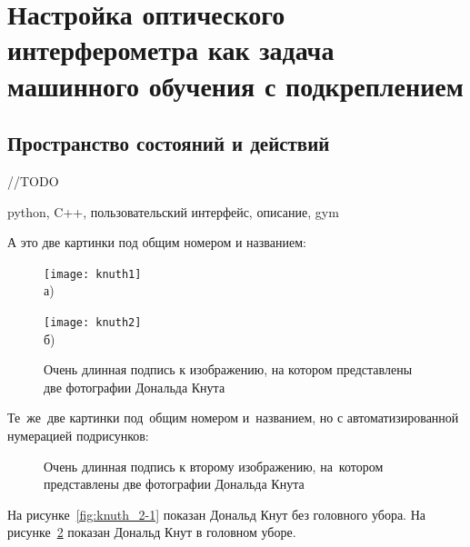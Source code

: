 \section{Настройка оптического интерферометра как задача машинного обучения с подкреплением}\label{sec:ch2/sect2}

\subsection{Пространство состояний и действий}

//TODO

python, C++, пользовательский интерфейс, описание, gym

А это две картинки под общим номером и названием:
\begin{figure}[ht]
    \begin{minipage}[b][][b]{0.49\linewidth}\centering
        \texttt{[image: knuth1]} \\ а)
    \end{minipage}
    \hfill
    \begin{minipage}[b][][b]{0.49\linewidth}\centering
        \texttt{[image: knuth2]} \\ б)
    \end{minipage}
    \caption{Очень длинная подпись к изображению,
        на котором представлены две фотографии Дональда Кнута}
    \label{fig:knuth}
\end{figure}

Те~же~две картинки под~общим номером и~названием,
но с автоматизированной нумерацией подрисунков:
\begin{figure}[ht]
    \caption[Этот текст попадает в названия рисунков в списке рисунков]{Очень
        длинная подпись к второму изображению, на~котором представлены две
        фотографии Дональда Кнута}\label{fig:knuth_2}
\end{figure}

На рисунке~\cref{fig:knuth_2-1} показан Дональд Кнут без головного убора.
На рисунке~\cref{fig:knuth_2}
показан Дональд Кнут в головном уборе.


